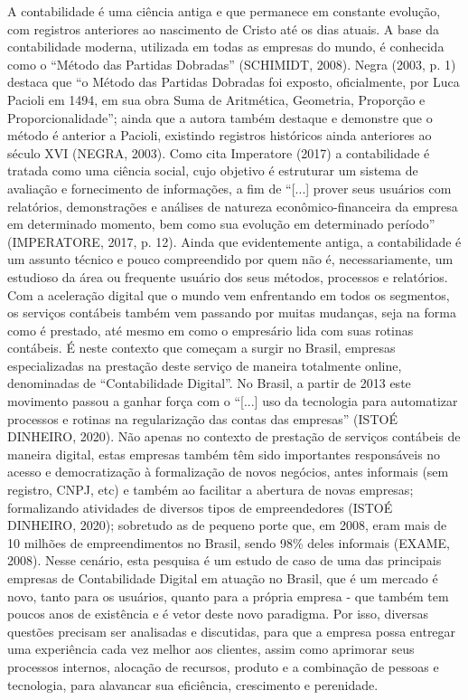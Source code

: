 \documentclass[twocolumn]{rbef}
\newcommand{\1}{\mathbbm{1}}
\begin{document}
A contabilidade é uma ciência antiga e que permanece em constante evolução, com registros anteriores ao nascimento de Cristo até os dias atuais. A base da contabilidade moderna, utilizada em todas as empresas do mundo, é conhecida como o “Método das Partidas Dobradas” (SCHIMIDT, 2008)\cite{SCHMIDT}. Negra (2003, p. 1)\cite{NEGRA} destaca que “o Método das Partidas Dobradas foi exposto, oficialmente, por Luca Pacioli em 1494, em sua obra Suma de Aritmética, Geometria, Proporção e Proporcionalidade”; ainda que a autora também destaque e demonstre que o método é anterior a Pacioli, existindo registros históricos ainda anteriores ao século XVI (NEGRA, 2003)\cite{NEGRA}.
\newline Como cita Imperatore (2017)\cite{IMPERATORE} a contabilidade é tratada como uma ciência social, cujo objetivo é estruturar um sistema de avaliação e fornecimento de informações, a fim de “[...] prover seus usuários com relatórios, demonstrações e análises de natureza econômico-financeira da empresa em determinado momento, bem como sua evolução em determinado período” (IMPERATORE, 2017, p. 12)\cite{IMPERATORE}. Ainda que evidentemente antiga, a contabilidade é um assunto técnico e pouco compreendido por quem não é, necessariamente, um estudioso da área ou frequente usuário dos seus métodos, processos e relatórios. 
\newline Com a aceleração digital que o mundo vem enfrentando em todos os segmentos, os serviços contábeis também vem passando por muitas mudanças, seja na forma como é prestado, até mesmo em como o empresário lida com suas rotinas contábeis. É neste contexto que começam a surgir no Brasil, empresas especializadas na prestação deste serviço de maneira totalmente online, denominadas de “Contabilidade Digital”. No Brasil, a partir de 2013 este movimento passou a ganhar força com o “[...] uso da tecnologia para automatizar processos e rotinas na regularização das contas das empresas” (ISTOÉ DINHEIRO, 2020)\cite{ISTOE}.
\newline Não apenas no contexto de prestação de serviços contábeis de maneira digital, estas empresas também têm sido importantes responsáveis no acesso e democratização à formalização de novos negócios, antes informais (sem registro, CNPJ, etc) e também ao facilitar a abertura de novas empresas; formalizando atividades de diversos tipos de empreendedores (ISTOÉ DINHEIRO, 2020)\cite{ISTOE}; sobretudo as de pequeno porte que, em 2008, eram mais de 10 milhões de empreendimentos no Brasil, sendo 98\% deles informais (EXAME, 2008)\cite{EXAME}.
\newline Nesse cenário, esta pesquisa é um estudo de caso de uma das principais empresas de Contabilidade Digital em atuação no Brasil, que é um mercado é novo, tanto para os usuários, quanto para a própria empresa - que também tem poucos anos de existência e é vetor deste novo paradigma. Por isso, diversas questões precisam ser analisadas e discutidas, para que a empresa possa entregar uma experiência cada vez melhor aos clientes, assim como aprimorar seus processos internos, alocação de recursos, produto e a combinação de pessoas e tecnologia, para alavancar sua eficiência, crescimento e perenidade.
\end{document}
